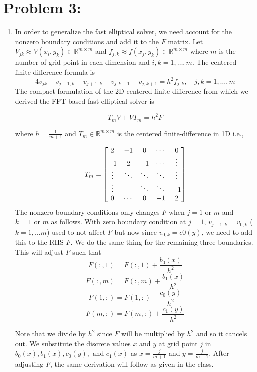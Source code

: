 \newpage
\section*{Problem 3:}
\begin{enumerate}
\item In order to generalize the fast elliptical solver, we need account for the nonzero boundary conditions and add it to the $F$ matrix. Let $V_{jk} \approx V(x_{i}, y_{k}) \in \mathbb{R}^{m\times m}$ and $f_{j,k} \approx f(x_{j}, y_{k}) \in \mathbb{R}^{m\times m}$ where $m$ is the number of grid point in each dimension and $i,k = 1, \dots, m$. The centered finite-difference formula is 
$$
4 v_{jk} - v_{j-1,k} - v_{j+1,k} - v_{j, k-1} - v_{j,k+1} = h^{2}f_{j,k}, \quad j,k=1, \dots, m
$$
The compact formulation of the 2D centered finite-difference from which we derived the FFT-based fast elliptical solver is 

$$
T_{m}V + VT_{m} = h^{2}F
$$

where $h=\frac{1}{m+1}$ and $T_{m}\in \mathbb{R}^{m\times m}$ is the centered finite-difference in 1D i.e., 

$$
T_{m} = 
\setcounter{MaxMatrixCols}{11}
\begin{bmatrix}
2 & -1& 0 & \cdots & 0\\
-1& 2 & -1& \cdots  & \vdots\\
\vdots & \ddots & \ddots & \ddots & \vdots\\
\vdots &   & \ddots & \ddots & -1\\
0 & \cdots & 0 & -1 & 2\\
\end{bmatrix}
$$
The nonzero boundary conditions only changes $F$  when $j=1 \text{\ or\ } m$ and $k=1 \text{\ or\ } m$ as follows. With zero boundary condition at $j=1$, $v_{j-1,k} = v_{0,k}$ ($k=1, \dots m $) used to not affect $F$ but now since $v_{0,k} = c0(y)$, we need to add this to the RHS $F$. We do the same thing for the remaining three boundaries. This will adjust $F$ such that 
$$F(:,1) = F(:,1) + \frac{b_{0}(x)}{h^{2}}$$
$$F(:,m) = F(:,m) + \frac{b_{1}(x)}{h^{2}}$$
$$F(1,:) = F(1,:) + \frac{c_{0}(y)}{h^{2}}$$
$$F(m,:) = F(m,:) + \frac{c_{1}(y)}{h^{2}}$$

Note that we divide by $h^{2}$ since $F$ will be multiplied by $h^{2}$ and so it cancels out. We substitute the discrete values $x$ and $y$ at grid point $j$ in $b_{0}(x), b_{1}(x), c_{0}(y),\text{\ and \ } c_{1}(x)$ as $x= \frac{j}{m+1}$ and $y= \frac{j}{m+1}$. After adjusting $F$, the same derivation will follow as given in the class. 
\end{enumerate}